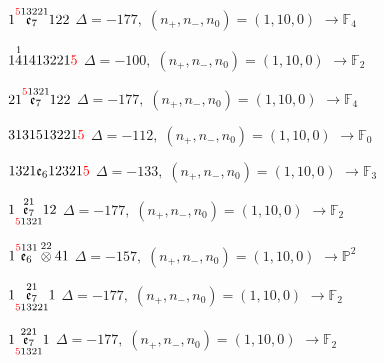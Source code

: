 \documentclass[10pt]{article}
\begin{document}
$1\overset{\textcolor{red}{5}13221}{\mathfrak{e}_7}122$ \quad $\Delta=-177,\; (n_+,n_-,n_0)=(1,10,0)$ \quad $\to \mathbb{F}_{4}$

\smallskip

$1\overset{1}{4}1413221\textcolor{red}{5}$ \quad $\Delta=-100,\; (n_+,n_-,n_0)=(1,10,0)$ \quad $\to \mathbb{F}_{2}$

\smallskip

$21\overset{\textcolor{red}{5}1321}{\mathfrak{e}_7}122$ \quad $\Delta=-177,\; (n_+,n_-,n_0)=(1,10,0)$ \quad $\to \mathbb{F}_{4}$

\smallskip

$3131513221\textcolor{red}{5}$ \quad $\Delta=-112,\; (n_+,n_-,n_0)=(1,10,0)$ \quad $\to \mathbb{F}_{0}$

\smallskip

$1321\mathfrak{e}_612321\textcolor{red}{5}$ \quad $\Delta=-133,\; (n_+,n_-,n_0)=(1,10,0)$ \quad $\to \mathbb{F}_{3}$

\smallskip

$1\overset{21}{\underset{\textcolor{red}{5}1321}{\mathfrak{e}_7}}12$ \quad $\Delta=-177,\; (n_+,n_-,n_0)=(1,10,0)$ \quad $\to \mathbb{F}_{2}$

\smallskip

$1\overset{\textcolor{red}{5}131}{\mathfrak{e}_6}\overset{22}{\otimes}41$ \quad $\Delta=-157,\; (n_+,n_-,n_0)=(1,10,0)$ \quad $\to \mathbb{P}^2$

\smallskip

$1\overset{21}{\underset{\textcolor{red}{5}13221}{\mathfrak{e}_7}}1$ \quad $\Delta=-177,\; (n_+,n_-,n_0)=(1,10,0)$ \quad $\to \mathbb{F}_{2}$

\smallskip

$1\overset{221}{\underset{\textcolor{red}{5}1321}{\mathfrak{e}_7}}1$ \quad $\Delta=-177,\; (n_+,n_-,n_0)=(1,10,0)$ \quad $\to \mathbb{F}_{2}$

\smallskip
\end{document}
